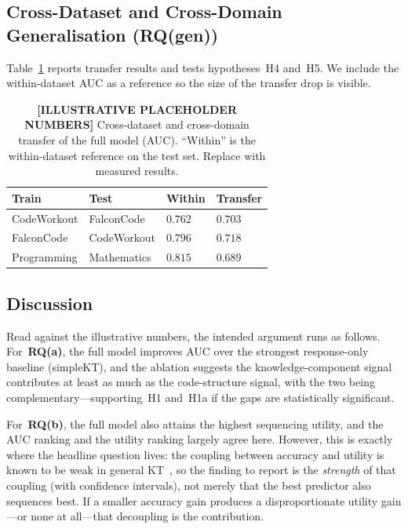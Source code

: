 \subsection{Cross-Dataset and Cross-Domain Generalisation (RQ(gen))}
Table~\ref{tab:transfer} reports transfer results and tests
hypotheses~H4 and~H5. We include the within-dataset AUC as a reference so
the size of the transfer drop is visible.

\begin{table}[t]
\caption{\textbf{[ILLUSTRATIVE PLACEHOLDER NUMBERS]} Cross-dataset and
cross-domain transfer of the full model (AUC). ``Within'' is the
within-dataset reference on the test set. Replace with measured results.}
\label{tab:transfer}
\centering
\small
\begin{tabular}{@{}llll@{}}
\toprule
\textbf{Train} & \textbf{Test} & \textbf{Within} & \textbf{Transfer} \\
\midrule
CodeWorkout & FalconCode  & $0.762$ & $0.703$ \\
FalconCode  & CodeWorkout & $0.796$ & $0.718$ \\
Programming & Mathematics & $0.815$ & $0.689$ \\
\bottomrule
\end{tabular}
\end{table}

\subsection{Discussion}
Read against the illustrative numbers, the intended argument runs as
follows. For~\textbf{RQ(a)}, the full model improves AUC over the
strongest response-only baseline (simpleKT), and the ablation suggests
the knowledge-component signal contributes at least as much as the
code-structure signal, with the two being complementary---supporting~H1
and~H1a if the gaps are statistically significant.

For~\textbf{RQ(b)}, the full model also attains the highest sequencing
utility, and the AUC ranking and the utility ranking largely agree here.
However, this is exactly where the headline question lives: the coupling
between accuracy and utility is known to be weak in general
KT~\cite{piech2015dkt}, so the finding to report is the \emph{strength}
of that coupling (with confidence intervals), not merely that the best
predictor also sequences best. If a smaller accuracy gain produces a
disproportionate utility gain---or none at all---that decoupling is the
contribution.

